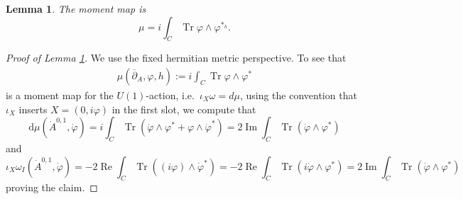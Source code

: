 \documentclass[12pt,letterpaper,reqno]{amsart}
\newtheorem{lem}[thm]{Lemma}
\theoremstyle{remark}
\theoremstyle{definition}
\numberwithin{thm}{section}
\numberwithin{equation}{section}
\numberwithin{figure}{section}
\newcommand{\delbar}{\ensuremath{\overline{\partial}}}
\newcommand{\de}{\mathrm{d}}
\DeclareMathOperator{\im}{Im}
\DeclareMathOperator{\re}{Re}
\DeclareMathOperator{\Tr}{Tr}
\begin{document}
\begin{lem}\label{lem:mu}
The moment map is 
\[\mu =  i \int_C \Tr \varphi \wedge \varphi^{*_h}.\]
 \end{lem}
\begin{proof}[Proof of Lemma \ref{lem:mu}]
We use the fixed hermitian metric perspective. To see that 
    \begin{align}
    \mu(\delbar_A, \varphi, h):=  i \int_C \Tr \varphi \wedge \varphi^*
    \end{align}
    is a moment map for the $U(1)$-action, i.e.\  $\iota_X \omega =d \mu$, using the convention that $\iota_X$ inserts  $X=(0, i \varphi)$ in the first slot,
    we compute that
    \[\de \mu(\dot{A}^{0,1}, \dot \varphi) =  i \int_C \Tr (\dot \varphi \wedge \varphi^* + \varphi \wedge \dot \varphi^* ) = 2 \im\int_C \Tr(\dot\varphi \wedge \varphi^*)  \]
    and 
    \[ \iota_X \omega_I (\dot{A}^{0,1}, \dot \varphi)= -2 \re \int_C \Tr((i \varphi) \wedge \dot\varphi^*) =-2 \re \int_C \Tr(i \dot \varphi  \wedge \varphi^*) = 2 \im \int_C \Tr(\dot\varphi \wedge \varphi^*)\]
    proving the claim.
   \end{proof}
\end{document}
